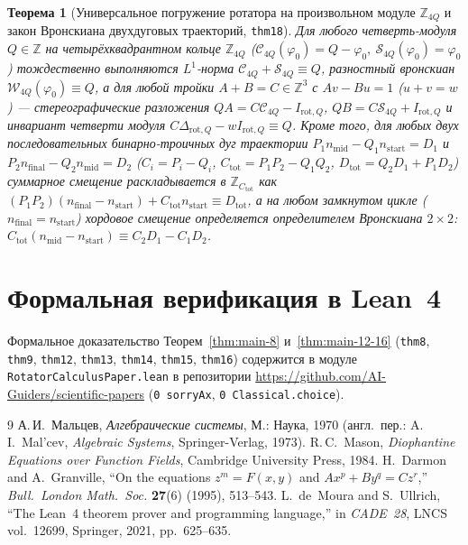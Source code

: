 \documentclass[11pt,a4paper]{article}
\theoremstyle{plain}
\newtheorem{theorem}{Теорема}[section]
\theoremstyle{definition}
\begin{document}
\begin{theorem}[Универсальное погружение ротатора на произвольном модуле $\mathbb{Z}_{4Q}$ и закон Вронскиана двухдуговых траекторий, \texttt{thm18}]
\label{thm:arbitrary-modulus-thm18}
Для любого четверть-модуля $Q\in\mathbb{Z}$ на четырёхквадрантном кольце $\mathbb{Z}_{4Q}$ ($\mathcal{C}_{4Q}(\varphi_0)=Q-\varphi_0,\ \mathcal{S}_{4Q}(\varphi_0)=\varphi_0$) тождественно выполняются $L^1$-норма $\mathcal{C}_{4Q}+\mathcal{S}_{4Q}\equiv Q$, разностный вронскиан $\mathcal{W}_{4Q}(\varphi_0)\equiv Q$, а для любой тройки $A+B=C\in\mathbb{Z}^3$ с $Av-Bu=1$ ($u+v=w$) --- стереографические разложения $Q A = C\mathcal{C}_{4Q} - I_{\mathrm{rot},Q}$, $Q B = C\mathcal{S}_{4Q} + I_{\mathrm{rot},Q}$ и инвариант четверти модуля $C\Delta_{\mathrm{rot},Q} - w I_{\mathrm{rot},Q} \equiv Q$. Кроме того, для любых двух последовательных бинарно-троичных дуг траектории $P_1 n_{\mathrm{mid}} - Q_1 n_{\mathrm{start}} = D_1$ и $P_2 n_{\mathrm{final}} - Q_2 n_{\mathrm{mid}} = D_2$ ($C_i = P_i - Q_i$, $C_{\mathrm{tot}} = P_1 P_2 - Q_1 Q_2$, $D_{\mathrm{tot}} = Q_2 D_1 + P_1 D_2$) суммарное смещение раскладывается в $\mathbb{Z}_{C_{\mathrm{tot}}}$ как $(P_1 P_2)(n_{\mathrm{final}} - n_{\mathrm{start}}) + C_{\mathrm{tot}} n_{\mathrm{start}} \equiv D_{\mathrm{tot}}$, а на любом замкнутом цикле ($n_{\mathrm{final}} = n_{\mathrm{start}}$) хордовое смещение определяется определителем Вронскиана $2\times 2$: $C_{\mathrm{tot}}(n_{\mathrm{mid}} - n_{\mathrm{start}}) \equiv C_2 D_1 - C_1 D_2$.
\end{theorem}

\section{Формальная верификация в Lean~4}
Формальное доказательство Теорем~\ref{thm:main-8} и~\ref{thm:main-12-16} (\texttt{thm8}, \texttt{thm9}, \texttt{thm12}, \texttt{thm13}, \texttt{thm14}, \texttt{thm15}, \texttt{thm16}) содержится в модуле \texttt{RotatorCalculusPaper.lean} в репозитории \url{https://github.com/AI-Guiders/scientific-papers} (\texttt{0 sorryAx}, \texttt{0 Classical.choice}).

\begin{thebibliography}{9}
А.\,И.~Мальцев, \emph{Алгебраические системы}, М.: Наука, 1970 (англ.\ пер.: A.\,I.~Mal'cev, \emph{Algebraic Systems}, Springer-Verlag, 1973).
R.\,C.~Mason, \emph{Diophantine Equations over Function Fields}, Cambridge University Press, 1984.
H.~Darmon and A.~Granville, ``On the equations $z^m = F(x,y)$ and $Ax^p + By^q = Cz^r$,'' \emph{Bull.~London Math.~Soc.} \textbf{27}(6) (1995), 513--543.
L.~de~Moura and S.~Ullrich, ``The Lean~4 theorem prover and programming language,'' in \emph{CADE~28}, LNCS vol.~12699, Springer, 2021, pp.~625--635.
\end{thebibliography}
\end{document}
